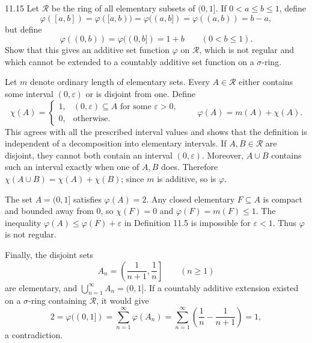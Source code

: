 \documentclass[11pt,oneside]{article}
\begin{document}
\begin{exercise}{11.15}
Let $\mathscr R$ be the ring of all elementary subsets of $(0,1]$. If $0<a\le b\le1$, define
\[
 \varphi([a,b])=\varphi([a,b))
 =\varphi((a,b])=\varphi((a,b))=b-a,
\]
but define
\[
 \varphi((0,b))=\varphi((0,b])=1+b
 \qquad(0<b\le1).
\]
Show that this gives an additive set function $\varphi$ on $\mathscr R$, which is not regular and which cannot be extended to a countably additive set function on a $\sigma$-ring.
\end{exercise}
\begin{solution}
Let $m$ denote ordinary length of elementary sets. Every $A\in\mathscr R$ either contains some interval $(0,\varepsilon)$ or is disjoint from one. Define
\[
 \chi(A)=\begin{cases}
 1,&(0,\varepsilon)\subseteq A\text{ for some }\varepsilon>0,\\
 0,&\text{otherwise}.
 \end{cases}
 \qquad\varphi(A)=m(A)+\chi(A).
\]
This agrees with all the prescribed interval values and shows that the definition is independent of a decomposition into elementary intervals. If $A,B\in\mathscr R$ are disjoint, they cannot both contain an interval $(0,\varepsilon)$. Moreover, $A\cup B$ contains such an interval exactly when one of $A,B$ does. Therefore
$\chi(A\cup B)=\chi(A)+\chi(B)$; since $m$ is additive, so is $\varphi$.

The set $A=(0,1]$ satisfies $\varphi(A)=2$. Any closed elementary $F\subseteq A$ is compact and bounded away from $0$, so $\chi(F)=0$ and $\varphi(F)=m(F)\le1$. The inequality $\varphi(A)\le\varphi(F)+\varepsilon$ in Definition 11.5 is impossible for $\varepsilon<1$. Thus $\varphi$ is not regular.

Finally, the disjoint sets
\[
 A_n=\left(\frac1{n+1},\frac1n\right]
 \qquad(n\ge1)
\]
are elementary, and $\bigcup_{n=1}^\infty A_n=(0,1]$. If a countably additive extension existed on a $\sigma$-ring containing $\mathscr R$, it would give
\[
 2=\varphi((0,1])
 =\sum_{n=1}^\infty\varphi(A_n)
 =\sum_{n=1}^\infty\left(\frac1n-\frac1{n+1}\right)=1,
\]
a contradiction.
\end{solution}
\end{document}
